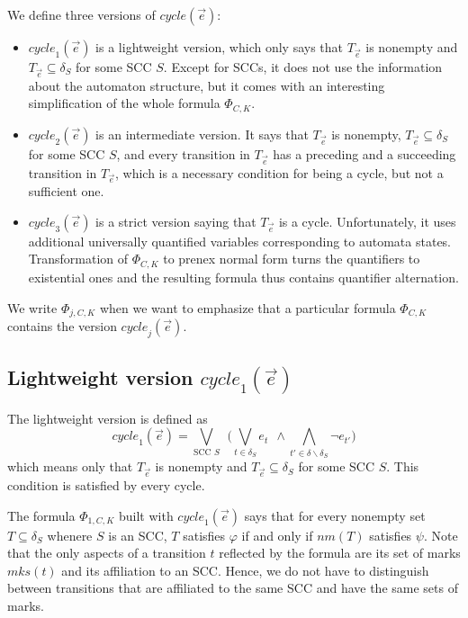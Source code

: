 \documentclass[a4paper,UKenglish,cleveref,autoref,thm-restate]{lipics-v2021}
\newcommand{\mks}{\mathit{mks}}
\newcommand{\rem}{\mathit{nm}}
\newcommand{\mcycle}{\mathit{cycle}}
\newcommand{\Te}{T_{\vec{e}}}
\begin{document}
We define three versions of $\mcycle(\vec{e})$:
\begin{itemize}
\item $\mcycle_1(\vec{e})$ is a lightweight version, which only says
  that $\Te$ is nonempty and $\Te\subseteq\delta_S$ for some SCC $S$.
  Except for SCCs, it does not use the information about the automaton
  structure, but it comes with an interesting simplification of the
  whole formula $\Phi_{C,K}$.
\item $\mcycle_2(\vec{e})$ is an intermediate version. It says that
  $\Te$ is nonempty, $\Te\subseteq\delta_S$ for some SCC $S$, and
  every transition in $\Te$ has %
  a preceding and a succeeding transition in $\Te$, which is a
  necessary condition for being a cycle, but not a sufficient one.
\item $\mcycle_3(\vec{e})$ is a strict version saying that $\Te$ is a
  cycle. Unfortunately, it uses additional universally quantified
  variables corresponding to automata states. Transformation of
  $\Phi_{C,K}$ to prenex normal form turns the quantifiers to
  existential ones and the resulting formula thus contains quantifier
  alternation.
\end{itemize}
We write $\Phi_{j,C,K}$ %
when we want to emphasize
that a particular formula $\Phi_{C,K}$ contains the version
$\mcycle_j(\vec{e})$.

\subsection{Lightweight version $\mcycle_1(\vec{e})$}
The lightweight version is defined as
\[
  \mcycle_1(\vec{e})=\bigvee_{\text{SCC } S}~~\big(\bigvee_{t\in\delta_S}e_t ~~\wedge \bigwedge_{t'\in\delta\smallsetminus\delta_S}\neg e_{t'}\big)
\]
which means only that $\Te$ is nonempty and $\Te\subseteq\delta_S$ for
some SCC $S$.
This condition is satisfied by every cycle.

The formula $\Phi_{1,C,K}$ built with $\mcycle_1(\vec{e})$ says that
for every nonempty set $T\subseteq\delta_S$ whenere $S$ is an SCC, $T$
satisfies $\varphi$ if and only if $\rem(T)$ satisfies $\psi$. Note
that the only aspects of a transition $t$ reflected by the formula are
its set of marks $\mks(t)$ and its affiliation to an SCC.
Hence, we do not have to distinguish between transitions that are
affiliated to the same SCC and have the same sets of marks.
\end{document}
